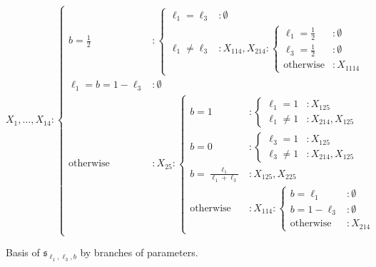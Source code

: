 \documentclass{amsart}
\theoremstyle{plain}
\theoremstyle{definition}
\theoremstyle{remark}
\newcommand{\mfk}[1]{\mathfrak{#1}}
\begin{document}
\begin{figure}[hbt]
    \centering
    \begin{equation*}
        X_1, \dots, X_{14}:
        \begin{cases}
            {b = \frac{1}{2}}& :
            \begin{cases}
                {\ell_1 = \ell_3}& :\emptyset\\
                {\ell_1 \neq \ell_3}& :X_{114}, X_{214} :
                \begin{cases}
                    {\ell_1 = \frac{1}{2}}& :\emptyset\\
                    {\ell_3 = \frac{1}{2}}& :\emptyset\\
                    {\text{otherwise}}& :X_{1114}
                \end{cases}
            \end{cases}\\
            {\ell_1 = b = 1 - \ell_3}& :\emptyset\\
            {\text{otherwise}}& :X_{25} :
            \begin{cases}
                {b=1}& :
                \begin{cases}
                    {\ell_1 = 1}& :X_{125}\\
                    {\ell_1 \neq 1}& :X_{214}, X_{125}
                \end{cases}\\
                {b = 0}& :
                \begin{cases}
                    {\ell_3 = 1}& :X_{125}\\
                    {\ell_3 \neq 1}& :X_{214}, X_{125}
                \end{cases}\\
                {b = \frac{\ell_1}{\ell_1 + \ell_3}}& :X_{125}, X_{225}\\
                
                {\text{otherwise}}& :X_{114} :
                \begin{cases}
                    {b = \ell_1}& :\emptyset\\
                    {b = 1 - \ell_3}& :\emptyset\\
                    {\text{otherwise}}& :X_{214}
                \end{cases}
            \end{cases}
        \end{cases}
    \end{equation*}%
    \caption{\centering Basis of $\mfk{s}_{\ell_1, \ell_3, b}$ by branches of parameters.}
    \label{fig:branches}
\end{figure}
\end{document}
